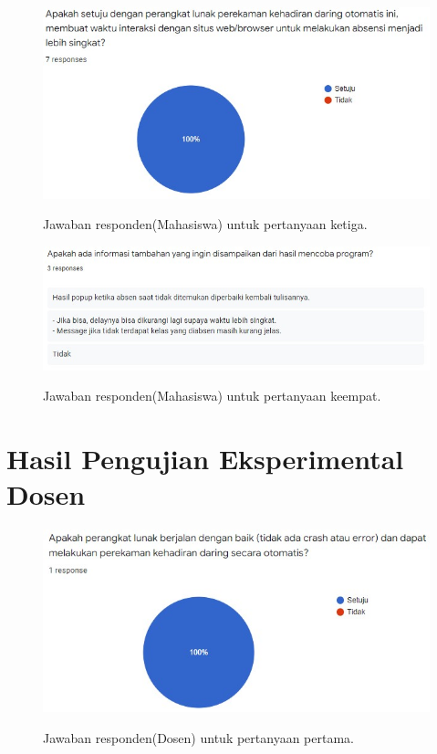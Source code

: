 \begin{figure}[H]
	\centering
	\includegraphics[scale=0.75]{Gambar/SurveiMahasiswa3.jpg}
	\label{}
	\caption{Jawaban responden(Mahasiswa) untuk pertanyaan ketiga.}
\end{figure}
	
\begin{figure}[H]
	\centering
	\includegraphics[scale=0.75]{Gambar/SurveiMahasiswa4.jpg}
	\label{}
	\caption{Jawaban responden(Mahasiswa) untuk pertanyaan keempat.}
\end{figure}

	
\section{Hasil Pengujian Eksperimental Dosen}
\begin{figure}[H]
	\centering
	\includegraphics[scale=0.75]{Gambar/SurveiDosen1.jpg}
	\label{}
	\caption{Jawaban responden(Dosen) untuk pertanyaan pertama.}
\end{figure}
	
